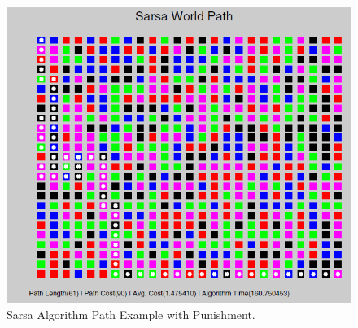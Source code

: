 \documentclass[12pt,american]{report}
\begin{document}
\begin{figure}
\centering
\includegraphics[scale=.75]{images/sarsa-example.PNG}
\caption{Sarsa Algorithm Path Example with Punishment.}
\label{fig:sarsa_example}
\end{figure}
\end{document}

